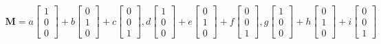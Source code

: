 \documentclass[preview]{standalone}
\begin{document}
\begin{align*}
\mathbf{M} = a \begin{bmatrix} 1 \\ 0 \\ 0 \end{bmatrix} + b \begin{bmatrix} 0 \\ 1 \\ 0 \end{bmatrix} + c \begin{bmatrix} 0 \\ 0 \\ 1 \end{bmatrix}, d \begin{bmatrix} 1 \\ 0 \\ 0 \end{bmatrix} + e \begin{bmatrix} 0 \\ 1 \\ 0 \end{bmatrix} + f \begin{bmatrix} 0 \\ 0 \\ 1 \end{bmatrix}, g \begin{bmatrix} 1 \\ 0 \\ 0 \end{bmatrix} + h \begin{bmatrix} 0 \\ 1 \\ 0 \end{bmatrix} + i \begin{bmatrix} 0 \\ 0 \\ 1 \end{bmatrix}
\end{align*}
\end{document}

